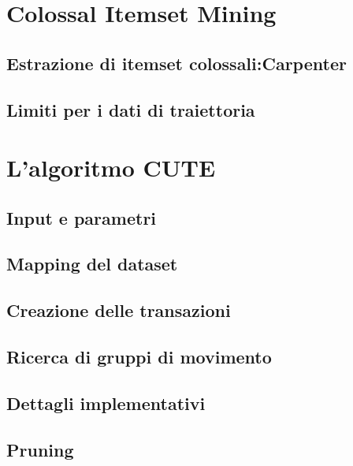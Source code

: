

\section{Colossal Itemset Mining}\label{sec:cute:cim}


\subsection{Estrazione di itemset colossali:Carpenter}\label{subsec:cute:carpenter}


\subsection{Limiti per i dati di traiettoria}\label{subsec:cute:applicationandlimits}


\section{L'algoritmo CUTE}\label{sec:cute:idea}


\subsection{Input e parametri}\label{subsec:cute:params}


\subsection{Mapping del dataset}\label{subsec:cute:mappingdataset}


\subsection{Creazione delle transazioni}\label{subsec:cute:transactioncreation}


\subsection{Ricerca di gruppi di movimento}\label{subsec:cute:ctm}


\subsection{Dettagli implementativi}\label{subsec:cute:implementation}


\subsection{Pruning}\label{subsec:cute:pruning}




